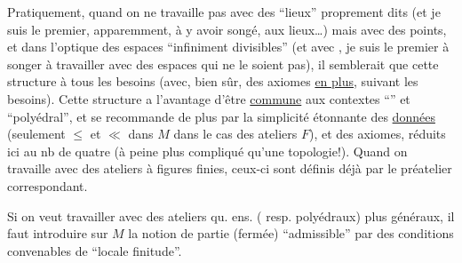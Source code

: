 
Pratiquement, quand on ne travaille pas avec des ``lieux'' proprement dits (et je suis le premier, apparemment, à y avoir songé, aux lieux\ldots) mais avec des points, et dans l'optique des espaces ``infiniment divisibles'' (et avec , je suis le premier à songer à travailler  avec des espaces qui ne le soient pas), il semblerait que  cette structure  à tous les besoins (avec, bien sûr, des axiomes \uline{en plus}, suivant les besoins). Cette structure a l'avantage d'être \uline{commune} aux contextes ``'' et ``polyédral'', et se recommande de plus par la simplicité étonnante des \uline{données} (seulement $\leq$ et $\ll$ dans $M$  dans le cas des ateliers $F$), et des axiomes, réduits ici au nb de quatre (à peine plus compliqué qu'une topologie!). Quand on travaille avec des  ateliers à figures finies, ceux-ci sont définis déjà par le préatelier correspondant.


Si on veut travailler avec des ateliers qu. ens. ( resp. polyédraux) plus généraux, il faut introduire sur $M$ la notion de  partie (fermée) ``admissible'' par des conditions convenables de ``locale finitude''.
